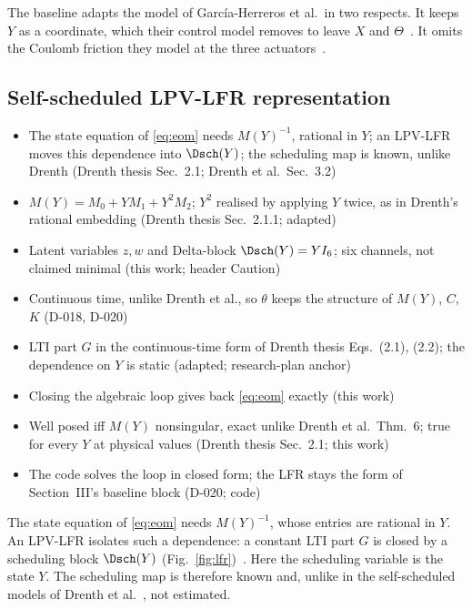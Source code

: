 The baseline adapts the model of Garc\'ia-Herreros et al.\ in two respects.
It keeps $Y$ as a coordinate, which their control model removes to leave
$X$ and $\Theta$~\cite[Eq.~(11)]{garcia2013model}.
It omits the Coulomb friction they model at the three
actuators~\cite[Eq.~(6)]{garcia2013model}.

\subsection{Self-scheduled LPV-LFR representation}\label{sec:lfr}
\ifdraft
\begin{itemize}
\item The state equation of \eqref{eq:eom} needs $M(Y)^{-1}$, rational in $Y$; an LPV-LFR moves this dependence into $\Dsch(Y)$; the scheduling map is known, unlike Drenth (Drenth thesis Sec.~2.1; Drenth et al.\ Sec.~3.2)
\item $M(Y)=M_0+YM_1+Y^2M_2$; $Y^2$ realised by applying $Y$ twice, as in Drenth's rational embedding (Drenth thesis Sec.~2.1.1; adapted)
\item Latent variables $z,w$ and Delta-block $\Dsch(Y)=YI_6$; six channels, not claimed minimal (this work; header Caution)
\item Continuous time, unlike Drenth et al., so $\theta$ keeps the structure of $M(Y)$, $C$, $K$ (D-018, D-020)
\item LTI part $G$ in the continuous-time form of Drenth thesis Eqs.~(2.1), (2.2); the dependence on $Y$ is static (adapted; research-plan anchor)
\item Closing the algebraic loop gives back \eqref{eq:eom} exactly (this work)
\item Well posed iff $M(Y)$ nonsingular, exact unlike Drenth et al.\ Thm.~6; true for every $Y$ at physical values (Drenth thesis Sec.~2.1; this work)
\item The code solves the loop in closed form; the LFR stays the form of Section~III's baseline block (D-020; code)
\end{itemize}
\fi

The state equation of \eqref{eq:eom} needs $M(Y)^{-1}$, whose entries are
rational in $Y$.
An LPV-LFR isolates such a dependence: a constant LTI part $G$ is closed by
a scheduling block $\Dsch(Y)$ (Fig.~\ref{fig:lfr})~\cite[Sec.~2.1]{drenth2025thesis}.
Here the scheduling variable is the state $Y$.
The scheduling map is therefore known and, unlike in the self-scheduled
models of Drenth et al.~\cite[Sec.~3.2]{drenth2025lpvlfr}, not estimated.

